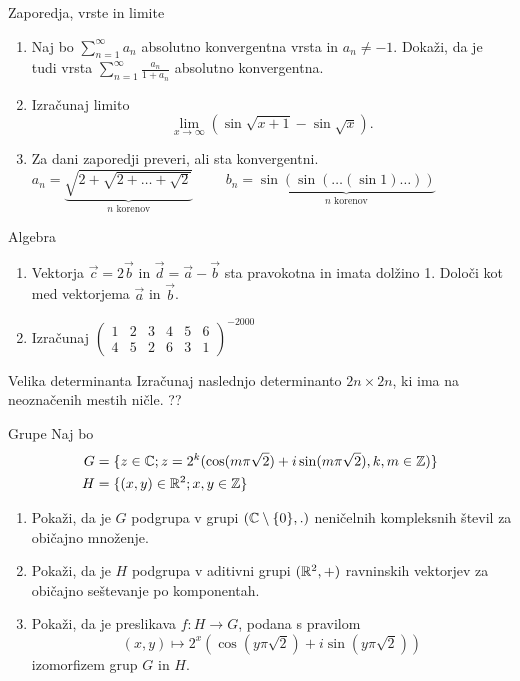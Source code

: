 \begin{frame}{Zaporedja, vrste in limite}
	\begin{enumerate}
		\item 
		Naj bo $\sum_{n=1}^\infty{a_n}$ absolutno konvergentna vrsta in $a_n \ne -1$.
		Dokaži, da je tudi vrsta $\sum_{n=1}^\infty \frac{a_n}{1+a_n}$
		absolutno konvergentna.

		\item
		Izračunaj limito
		$$\lim_{x\to\infty} (\sin \sqrt{x+1} - \sin \sqrt{x}).$$

		\item
		Za dani zaporedji preveri, ali sta konvergentni.
		$a_n = \underbrace{\sqrt{2+\sqrt{2+\dots+\sqrt{2}}}}_{n \text{ korenov}} \qquad$
		$b_n = \underbrace{\sin(\sin(\dots(\sin 1)\dots))}_{n \text{ korenov}} $
		
	\end{enumerate}
\end{frame}

\begin{frame}{Algebra}
	\begin{enumerate}
		\item
		Vektorja $\vec{c} = 2\vec{b}$ in $\vec{d} = \vec{a} - \vec{b}$
		sta pravokotna in imata dolžino 1. Določi kot med vektorjema $\vec{a}$ in $\vec{b}$.
		\item 
		Izračunaj
		$\begin{pmatrix}
			1 & 2 & 3 & 4 & 5 & 6\\
			4 & 5 & 2 & 6 & 3 & 1
		\end{pmatrix}^{-2000}$
	
	\end{enumerate}
\end{frame}

\begin{frame}{Velika determinanta}
	Izračunaj naslednjo determinanto $2n \times 2n$, ki ima na neoznačenih mestih ničle.
	??
\end{frame}

\begin{frame}{Grupe}
	Naj bo
	\begin{align*}
		G &= \{z\in \mathbb{C}; z = 2^k(\cos(m\pi\sqrt{2}) + i \sin(m\pi\sqrt{2}), k, m\in \mathbb{Z})\}\\
		H &= \{(x, y)\in \mathbb{R}^2; x,y\in \mathbb{Z}\}
	\end{align*}
	
	\begin{enumerate}
		\item
			Pokaži, da je $G$ podgrupa v grupi $(\mathbb{C} \setminus \{0\},. )$
			neničelnih kompleksnih števil za običajno množenje.
		\item
			Pokaži, da je $H$ podgrupa v aditivni grupi $(\mathbb{R}^2, +)$
			ravninskih vektorjev za običajno seštevanje po komponentah.
		\item
			Pokaži, da je preslikava $f:H\to G$, podana s pravilom
			$$(x, y)\mapsto 2^x(\cos(y\pi\sqrt{2})+ i \sin(y\pi\sqrt{2}))$$
			izomorfizem grup $G$ in $H$.
	\end{enumerate}
\end{frame}
